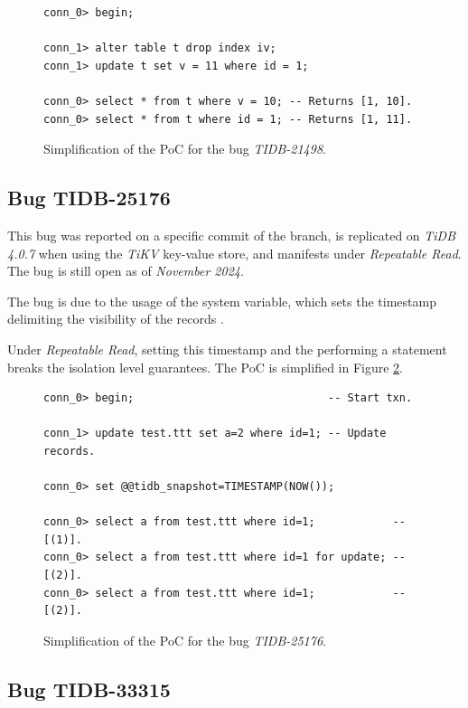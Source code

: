 \begin{figure}
\begin{verbatim}
conn_0> begin;

conn_1> alter table t drop index iv;
conn_1> update t set v = 11 where id = 1;

conn_0> select * from t where v = 10; -- Returns [1, 10].
conn_0> select * from t where id = 1; -- Returns [1, 11].
\end{verbatim}
\caption{Simplification of the PoC for the bug \textit{TIDB-21498}.} \label{fig:TIDB-21498}
\end{figure}

\subsection*{Bug TIDB-25176}

This bug was reported on a specific commit of the  branch, is replicated on \textit{TiDB 4.0.7} when using the \textit{TiKV} key-value store, and manifests under \textit{Repeatable Read}. The bug is still open as of \textit{November 2024}.

The bug is due to the usage of the  system variable, which sets the timestamp delimiting the visibility of the records \cite{tidbsnapshot}. 

Under \textit{Repeatable Read}, setting this timestamp and the performing a  statement breaks the isolation level guarantees. The PoC is simplified in Figure \ref{fig:TIDB-25176}.

\begin{figure}
\begin{verbatim}
conn_0> begin;                              -- Start txn.
    
conn_1> update test.ttt set a=2 where id=1; -- Update records.

conn_0> set @@tidb_snapshot=TIMESTAMP(NOW());

conn_0> select a from test.ttt where id=1;            -- [(1)].
conn_0> select a from test.ttt where id=1 for update; -- [(2)].
conn_0> select a from test.ttt where id=1;            -- [(2)].
\end{verbatim}
\caption{Simplification of the PoC for the bug \textit{TIDB-25176}.} \label{fig:TIDB-25176}
\end{figure}

\subsection*{Bug TIDB-33315}

